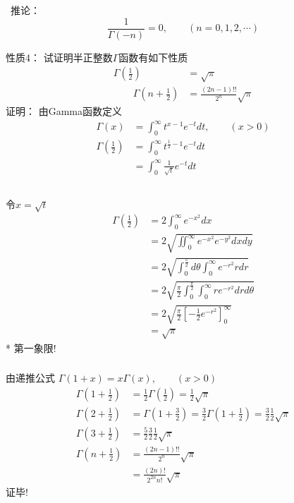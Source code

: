 \begin{frame}
	 推论： 
	\begin{equation*}
		\frac{1}{\Gamma(-n)} =0, \qquad (n=0,1,2, \cdots)
	\end{equation*}	 \vspace{2cm}
\end{frame}	

\begin{frame}
	\alert{性质4：} 试证明半正整数$\Gamma$函数有如下性质 
	\begin{equation*}
		\begin{split}
		\Gamma(\frac{1}{2}) &=\sqrt{\pi} \\ 
		\qquad  \Gamma(n+\frac{1}{2}) &= \frac{(2n-1)!!}{2^n} \sqrt{\pi}
		\end{split}	
	\end{equation*}	
	\alert{证明：}  由Gamma函数定义
	\[
	\begin{aligned}
		 \Gamma(x)&=\int_{0}^{\infty} t^{x-1} e^{-t} dt, \qquad (x>0) \\
		 \Gamma(\frac{1}{2})&=\int_{0}^{\infty} t^{\frac{1}{2}-1} e^{-t} dt\\
		 &=\int_{0}^{\infty} \frac{1}{\sqrt{t}} e^{-t} dt\\
	\end{aligned}	
	\]
\end{frame}

\begin{frame}
	  \frametitle{}
	  令$x=\sqrt{t}$
	  \[
		\begin{aligned}
			 \Gamma(\frac{1}{2})
			 &=2\int_{0}^{\infty} e^{-x^2} dx\\
			 &=2\sqrt{\iint_{0}^{\infty} e^{-x^2} e^{-y^2} dxdy}\\
			 &=2\sqrt{\int_{0}^{\frac{\pi}{2}} d\theta \int_{0}^{\infty}  e^{-r^2} r dr }\\
			 &=2\sqrt{\frac{\pi}{2}\int_{0}^{\frac{\pi}{2}} \int_{0}^{\infty} r e^{-r^2} dr d\theta}\\
			 &=2\sqrt{\frac{\pi}{2}[-\frac{1}{2} e^{-r^2}]_{0}^{\infty} }\\
			 &=\sqrt{\pi}
		\end{aligned}	
		\]  
	* 第一象限!			
\end{frame}	

\begin{frame}
	  \frametitle{}
	  由递推公式 $\Gamma(1+x)=x \Gamma(x) ,\qquad (x>0)$\\
	  \[
	\begin{aligned}
		\Gamma(1+\frac{1}{2})&= \frac{1}{2} \Gamma(\frac{1}{2}) =\frac{1}{2} \sqrt{\pi}\\
		\Gamma(2+\frac{1}{2})&= \Gamma(1+\frac{3}{2})=\frac{3}{2} \Gamma(1+\frac{1}{2}) = \frac{3}{2}\frac{1}{2}\sqrt{\pi}\\
		\Gamma(3+\frac{1}{2})& = \frac{5}{2} \frac{3}{2}\frac{1}{2}\sqrt{\pi}\\
		\Gamma(n+\frac{1}{2})& = \frac{(2n-1)!!}{2^n}\sqrt{\pi}\\
		 & = \frac{(2n)!}{2^{2n} n!}\sqrt{\pi}
	\end{aligned} 
	  \]
	证毕!

\end{frame}


